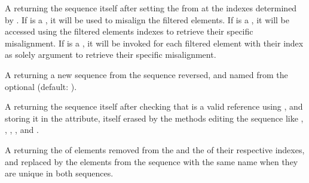 \documentclass[letterpaper,10pt,english]{sphinxmanual}
\begin{document}
\begin{description}
\sphinxAtStartPar
A   returning the sequence itself after setting the {\hyperref[\detokenize{elements:elm-misalign}]{}} from
 at the indexes determined by . If  is a , it will be used to misalign the filtered elements.
If  is a , it will be accessed using the filtered elements indexes to retrieve their specific misalignment.
If  is a  , it will be invoked for each filtered element with their index as solely argument to retrieve their specific misalignment.

\sphinxAtStartPar
A  \sphinxcode{\sphinxupquote{({[}name{]})}} returning a new sequence from the sequence reversed, and named from the optional   (default: ).

\sphinxAtStartPar
A   returning the sequence itself after checking that  is a valid reference using , and storing it in the  attribute,
itself erased by the methods editing the sequence like , , , , and .

\sphinxAtStartPar
A   returning the  of elements removed from the  and the  of their respective indexes, and replaced by the elements from the
sequence with the same name when they are unique in both sequences.


\end{description}
\end{document}
